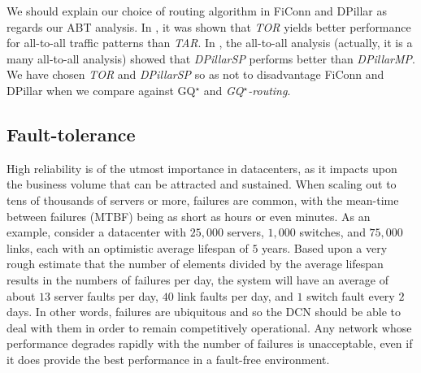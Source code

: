 \documentclass[]{amsart}
\begin{document}
We should explain our choice of routing algorithm in FiConn and DPillar as regards our ABT analysis. In \cite{LiGuoWu2011}, it was shown that \emph{TOR\/} yields better performance for all-to-all traffic patterns than \emph{TAR\/}. In \cite{LiaoYinYin2012}, the all-to-all analysis (actually, it is a many all-to-all analysis) showed that \emph{DPillarSP\/} performs better than \emph{DPillarMP\/}. We have chosen \emph{TOR\/} and \emph{DPillarSP\/} so as not to disadvantage FiConn and DPillar when we compare against GQ$^\star$ and \emph{GQ$^\star$-routing\/}.



\subsection{Fault-tolerance}
\label{sec:setup-fault}
High reliability is of the utmost importance in datacenters, as it impacts upon the business volume that can be attracted and sustained.  When scaling out to tens of thousands of servers or more, failures are common, with the mean-time between failures (MTBF) being as short as hours or even minutes. As an example, consider a datacenter with $25,000$ servers, $1,000$ switches, and $75,000$ links, each with an optimistic average lifespan of $5$ years. Based upon a very rough estimate that the number of elements divided by the average lifespan results in the numbers of failures per day, the system will have an average of about $13$ server faults per day, $40$ link faults per day, and $1$ switch fault every $2$ days. In other words, failures are ubiquitous and so the DCN should be able to deal with them in order to remain competitively operational. Any network whose performance degrades rapidly with the number of failures is unacceptable, even if
it does provide the best performance in a fault-free environment.
\end{document}
